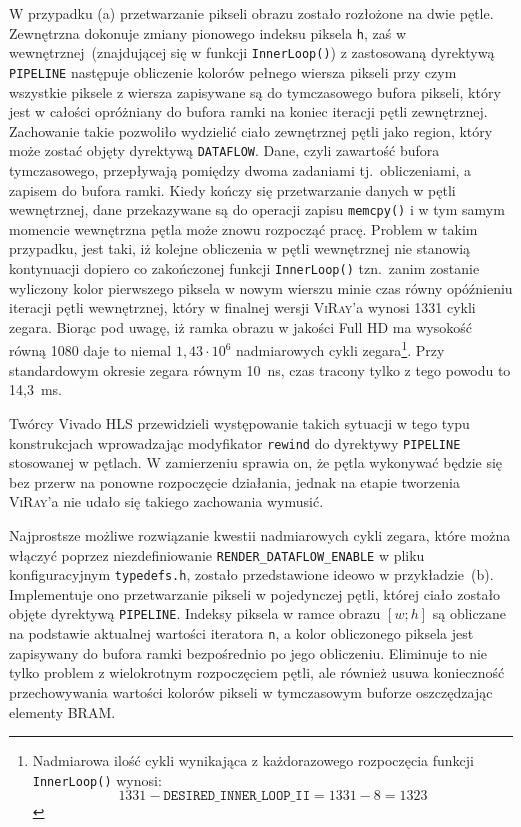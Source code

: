 \begin{enumerate}
\begin{enumerate}
\end{enumerate}
W przypadku (a) przetwarzanie pikseli obrazu zostało rozłożone na dwie pętle. Zewnętrzna dokonuje zmiany pionowego indeksu piksela \texttt{h}, zaś w wewnętrznej~(znajdującej się w funkcji \texttt{InnerLoop()}) z zastosowaną dyrektywą \texttt{PIPELINE} następuje obliczenie kolorów pełnego wiersza pikseli przy czym wszystkie piksele z wiersza zapisywane są do tymczasowego bufora pikseli, który jest w całości opróżniany do bufora ramki na koniec iteracji pętli zewnętrznej. Zachowanie takie pozwoliło wydzielić ciało zewnętrznej pętli jako region, który może zostać objęty dyrektywą \texttt{DATAFLOW}. Dane, czyli zawartość bufora tymczasowego, przepływają pomiędzy dwoma zadaniami tj.~obliczeniami, a zapisem do bufora ramki. Kiedy kończy się przetwarzanie danych w pętli wewnętrznej, dane przekazywane są do operacji zapisu \texttt{memcpy()} i w tym samym momencie wewnętrzna pętla może znowu rozpocząć pracę. Problem w takim przypadku, jest taki, iż kolejne obliczenia w pętli wewnętrznej nie stanowią kontynuacji dopiero co zakończonej funkcji \texttt{InnerLoop()} tzn.~zanim zostanie wyliczony kolor pierwszego piksela w nowym wierszu minie czas równy opóźnieniu iteracji pętli wewnętrznej, który w finalnej wersji \textsc{ViRay}'a wynosi 1331 cykli zegara. Biorąc pod uwagę, iż ramka obrazu w jakości Full HD ma wysokość równą 1080 daje to niemal $1,43\cdot 10^6$ nadmiarowych cykli zegara\footnote{Nadmiarowa ilość cykli wynikająca z każdorazowego rozpoczęcia funkcji \texttt{InnerLoop()} wynosi: 
\begin{equation}
1331 - \mathtt{DESIRED\_INNER\_LOOP\_II} = 1331 - 8 = 1323
\end{equation}
}. Przy standardowym okresie zegara równym 10~ns, czas tracony tylko z tego powodu to 14,3~ms. 

Twórcy Vivado HLS przewidzieli występowanie takich sytuacji w tego typu konstrukcjach wprowadzając modyfikator \texttt{rewind} do dyrektywy \texttt{PIPELINE} stosowanej w pętlach. W zamierzeniu sprawia on, że pętla wykonywać będzie się bez przerw na ponowne rozpoczęcie działania, jednak na etapie tworzenia \textsc{ViRay}'a nie udało się takiego zachowania wymusić.

Najprostsze możliwe rozwiązanie kwestii nadmiarowych cykli zegara, które można włączyć poprzez niezdefiniowanie \texttt{RENDER\_DATAFLOW\_ENABLE} w pliku konfiguracyjnym \texttt{typedefs.h}, zostało przedstawione ideowo w przykładzie~(b). Implementuje ono przetwarzanie pikseli w pojedynczej pętli, której ciało zostało objęte dyrektywą \texttt{PIPELINE}. Indeksy piksela w ramce obrazu $[w;h]$ są obliczane na podstawie aktualnej wartości iteratora \texttt{n}, a kolor obliczonego piksela jest zapisywany do bufora ramki bezpośrednio po jego obliczeniu. Eliminuje to nie tylko problem z wielokrotnym rozpoczęciem pętli, ale również usuwa konieczność przechowywania wartości kolorów pikseli w tymczasowym buforze oszczędzając elementy BRAM. 


\end{enumerate}

